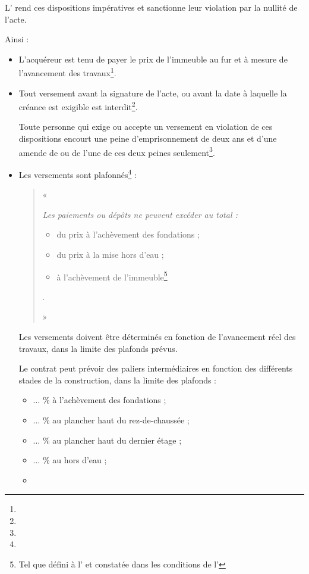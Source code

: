 			L' rend ces dispositions impératives et sanctionne leur violation par la nullité de l’acte.

			Ainsi :
			\begin{itemize}
				\item L’acquéreur est tenu de payer le prix de l’immeuble au fur et à mesure de l'avancement des travaux\footnote{}.

				\item Tout versement avant la signature de l’acte, ou avant la date à laquelle la créance est exigible est interdit\footnote{}.

				Toute personne qui exige ou accepte un versement en violation de ces dispositions encourt une peine d'emprisonnement de deux ans et d'une amende de  ou de l'une de ces deux peines seulement\footnote{}.


				\item Les versements sont plafonnés\footnote{} :
					\begin{quote}
						« { \itshape Les paiements ou dépôts ne peuvent excéder au total :
						\begin{itemize}
							\item {} du prix à l'achèvement des fondations ;
							\item {} du prix à la mise hors d'eau ;
							\item {} à l'achèvement de l'immeuble\footnote{Tel que défini à l’ et constatée dans les conditions de l’}
						\end{itemize}.}»
					\end{quote}

				Les versements doivent être déterminés en fonction de l'avancement réel des travaux, dans la limite des plafonds prévus.

				Le contrat peut prévoir des paliers intermédiaires en fonction des différents stades de la construction, dans la limite des plafonds :
				\begin{itemize}
					\item $\dots$ \% à l'achèvement des fondations ;
					\item $\dots$ \% au plancher haut du rez-de-chaussée ;
					\item $\dots$ \% au plancher haut du dernier étage ;
					\item $\dots$ \% au hors d’eau ;
					\item 	\etc
				\end{itemize}


\end{itemize}
